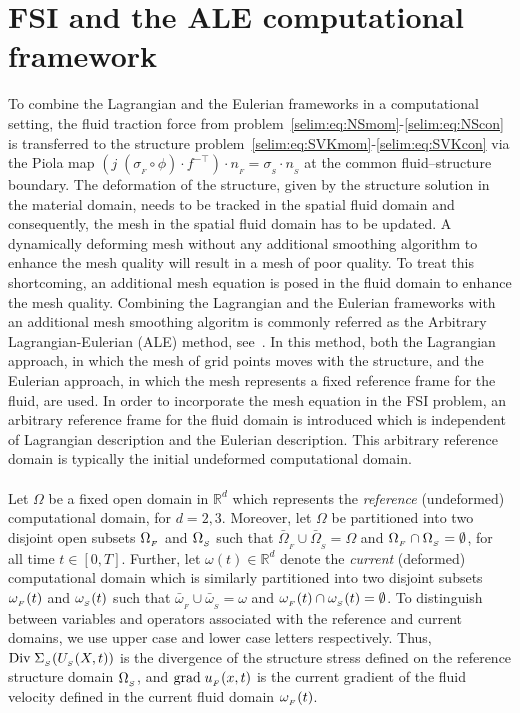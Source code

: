 \section{FSI and the ALE computational framework}
\label{selim:sec:ale}
To combine the Lagrangian and the Eulerian frameworks in a
computational setting, the fluid traction force from
problem~\eqref{selim:eq:NSmom}-\eqref{selim:eq:NScon} is transferred
to the structure
problem~\eqref{selim:eq:SVKmom}-\eqref{selim:eq:SVKcon} via the Piola
map $(j\; (\sigma_{_{F}}\circ \phi)\cdot f^{-\top})\cdot n_{_{F}}
= \sigma_{_{S}}\cdot n_{_{S}}$ at the common fluid--structure
boundary.  The deformation of the structure, given by the structure
solution in the material domain, needs to be tracked in the spatial
fluid domain and consequently, the mesh in the spatial fluid domain
has to be updated. A dynamically deforming mesh without any additional
smoothing algorithm to enhance the mesh quality will result in a mesh
of poor quality. To treat this shortcoming, an additional mesh
equation is posed in the fluid domain to enhance the mesh
quality. Combining the Lagrangian and the Eulerian frameworks with an
additional mesh smoothing algoritm is commonly referred as the
Arbitrary Lagrangian-Eulerian (ALE) method,
see~\cite{DoneaGiulianiEtAl1982, DoneaHuertaEtAl2004}.  In this
method, both the Lagrangian approach, in which the mesh of grid points
moves with the structure, and the Eulerian approach, in which the mesh
represents a fixed reference frame for the fluid, are used. In order
to incorporate the mesh equation in the FSI problem, an arbitrary
reference frame for the fluid domain is introduced which is
independent of Lagrangian description and the Eulerian
description. This arbitrary reference domain is typically the initial
undeformed computational domain.
\\\\
Let $\Omega$ be a fixed open domain in $\mathbb{R}^d$ which represents
the \emph{reference} (undeformed) computational domain, for
$d=2,3$. Moreover, let $\Omega$ be partitioned into two disjoint open
subsets $\Omega_{_{F}}$ and $\Omega_{_{S}}$ such that
$\bar{\Omega}_{_{F}}\cup\bar{\Omega}_{_{S}} = \Omega$ and
$\Omega_{_{F}}\cap\Omega_{_{S}}=\emptyset$, for all time $t\in[0,T]$. Further, let
$\omega(t)\in\mathbb{R}^d$ denote the \emph{current} (deformed)
computational domain which is similarly partitioned into two disjoint
subsets $\omega_{_{F}}(t)$ and $\omega_{_{S}}(t)$ such that
$\bar{\omega}_{_{F}}\cup\bar{\omega}_{_{S}} = \omega$ and
$\omega_{_{F}}(t)\cap\omega_{_{S}}(t)=\emptyset$. To distinguish between variables and
operators associated with the reference and current domains, we use
upper case and lower case letters respectively. Thus,
$\textrm{Div}\;\Sigma_{_{S}}(U_{_{S}}(X,t))$ is the divergence of the structure stress
defined on the reference structure domain $\Omega_{_{S}}$, and $\textrm{grad}\;u_{_{F}}(x,t)$ is
the current gradient of the fluid velocity defined in the current
fluid domain $\omega_{_{F}}(t)$.

